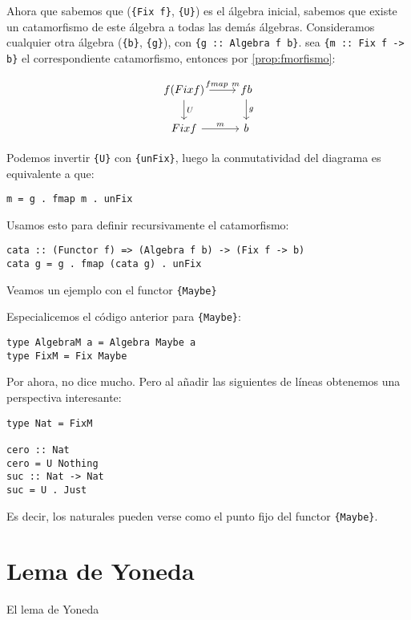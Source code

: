\documentclass[12pt, twoside]{book}
\newcommand{\code}[1]{\Verb+{#1}+}
\begin{document}
Ahora que sabemos que (\code{Fix f}, \code{U}) es el álgebra inicial, sabemos que existe un catamorfismo de este álgebra a todas las demás álgebras.
Consideramos cualquier otra álgebra (\code{b}, \code{g}), con \code{g :: Algebra f b}. sea \code{m :: Fix f -> b} el correspondiente catamorfismo, entonces por \ref{prop:fmorfismo}:

\[
\begin{tikzcd}
{f (Fix f)} \arrow[r,"fmap\ m"] \arrow[d,"U"] & f b \arrow[d,"g"]\\
{Fix f} \arrow[r,"m"] & b
\end{tikzcd}
\]

Podemos invertir \code{U} con \code{unFix}, luego la conmutatividad del diagrama es equivalente a que:
\begin{verbatim}
m = g . fmap m . unFix
\end{verbatim}
Usamos esto para definir recursivamente el catamorfismo:
\begin{verbatim}
cata :: (Functor f) => (Algebra f b) -> (Fix f -> b)
cata g = g . fmap (cata g) . unFix
\end{verbatim}

Veamos un ejemplo con el functor \code{Maybe}
\begin{example}
Especialicemos el código anterior para \code{Maybe}:
\begin{verbatim}
type AlgebraM a = Algebra Maybe a
type FixM = Fix Maybe
\end{verbatim}
Por ahora, no dice mucho. Pero al añadir las siguientes de líneas obtenemos una perspectiva interesante:
\begin{verbatim}
type Nat = FixM

cero :: Nat
cero = U Nothing
suc :: Nat -> Nat
suc = U . Just
\end{verbatim}
Es decir, los naturales pueden verse como el punto fijo del functor \code{Maybe}.
\end{example}

\chapter{Lema de Yoneda}

El lema de Yoneda

\backmatter



\end{document}
